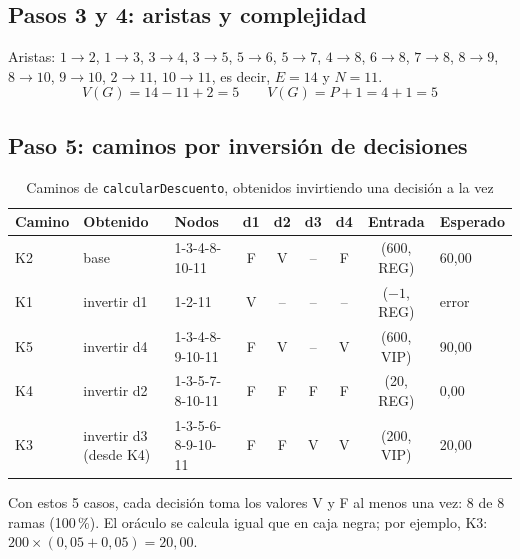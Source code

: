 \documentclass[11pt,a4paper,oneside]{report}
\newcommand{\code}[1]{\texttt{#1}}
\begin{document}
\subsection{Pasos 3 y 4: aristas y complejidad}
Aristas: $1{\rightarrow}2$, $1{\rightarrow}3$, $3{\rightarrow}4$, $3{\rightarrow}5$, $5{\rightarrow}6$, $5{\rightarrow}7$, $4{\rightarrow}8$, $6{\rightarrow}8$, $7{\rightarrow}8$, $8{\rightarrow}9$, $8{\rightarrow}10$, $9{\rightarrow}10$, $2{\rightarrow}11$, $10{\rightarrow}11$, es decir, $E = 14$ y $N = 11$.
\[
V(G) = 14 - 11 + 2 = 5 \qquad V(G) = P + 1 = 4 + 1 = 5
\]

\subsection{Paso 5: caminos por inversión de decisiones}
\begin{table}[H]
\centering
\caption{Caminos de \code{calcularDescuento}, obtenidos invirtiendo una decisión a la vez}
\small
\begin{tabular}{lllcccccl}
\toprule
\textbf{Camino} & \textbf{Obtenido} & \textbf{Nodos} & \textbf{d1} & \textbf{d2} & \textbf{d3} & \textbf{d4} & \textbf{Entrada} & \textbf{Esperado}\\
\midrule
K2 & base & 1-3-4-8-10-11 & F & V & -- & F & (600, REG) & 60,00\\
K1 & invertir d1 & 1-2-11 & V & -- & -- & -- & ($-1$, REG) & error\\
K5 & invertir d4 & 1-3-4-8-9-10-11 & F & V & -- & V & (600, VIP) & 90,00\\
K4 & invertir d2 & 1-3-5-7-8-10-11 & F & F & F & F & (20, REG) & 0,00\\
K3 & invertir d3 (desde K4) & 1-3-5-6-8-9-10-11 & F & F & V & V & (200, VIP) & 20,00\\
\bottomrule
\end{tabular}
\end{table}
Con estos 5 casos, cada decisión toma los valores V y F al menos una vez: 8 de 8 ramas (100\,\%). El oráculo se calcula igual que en caja negra; por ejemplo, K3: $200 \times (0{,}05 + 0{,}05) = 20{,}00$.
\end{document}
